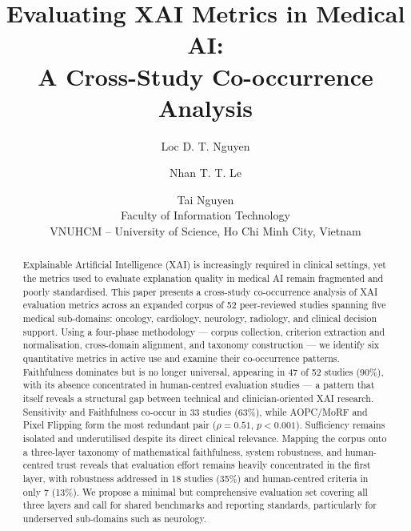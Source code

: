 \documentclass{article}
\author{
Loc D. T. Nguyen \and
Nhan T. T. Le \and
Tai Nguyen \\
Faculty of Information Technology \\
VNUHCM -- University of Science, Ho Chi Minh City, Vietnam
}
\title{Evaluating XAI Metrics in Medical AI:\\
A Cross-Study Co-occurrence Analysis}
\date{}
\begin{document}
\maketitle

\begin{abstract}
Explainable Artificial Intelligence (XAI) is increasingly required in clinical settings, yet the metrics used to evaluate explanation quality in medical AI remain fragmented and poorly standardised. This paper presents a cross-study co-occurrence analysis of XAI evaluation metrics across an expanded corpus of 52 peer-reviewed studies spanning five medical sub-domains: oncology, cardiology, neurology, radiology, and clinical decision support. Using a four-phase methodology --- corpus collection, criterion extraction and normalisation, cross-domain alignment, and taxonomy construction --- we identify six quantitative metrics in active use and examine their co-occurrence patterns. Faithfulness dominates but is no longer universal, appearing in 47 of 52 studies (90\%), with its absence concentrated in human-centred evaluation studies --- a pattern that itself reveals a structural gap between technical and clinician-oriented XAI research. Sensitivity and Faithfulness co-occur in 33 studies (63\%), while AOPC/MoRF and Pixel Flipping form the most redundant pair ($\rho = 0.51$, $p < 0.001$). Sufficiency remains isolated and underutilised despite its direct clinical relevance. Mapping the corpus onto a three-layer taxonomy of mathematical faithfulness, system robustness, and human-centred trust reveals that evaluation effort remains heavily concentrated in the first layer, with robustness addressed in 18 studies (35\%) and human-centred criteria in only 7 (13\%). We propose a minimal but comprehensive evaluation set covering all three layers and call for shared benchmarks and reporting standards, particularly for underserved sub-domains such as neurology.
\end{abstract}









\end{document}
